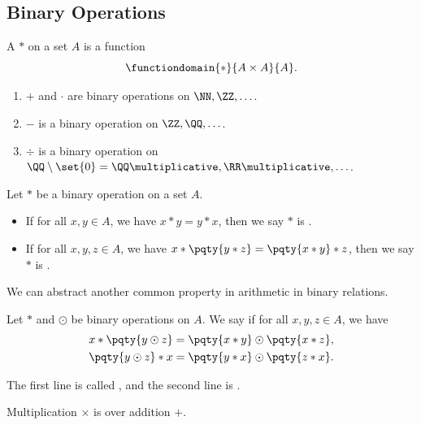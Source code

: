 \subsection{Binary Operations}
\label{sec:binary-operations}

\begin{definition}
    A  \(\ast\) on a set \(A\) is a function
    \[
        \functiondomain{\ast}{A \times A}{A}.
    \]
\end{definition}

\begin{examples}
    \begin{enumerate}
        \item \(+\) and \(\cdot\) are binary operations on \(\NN, \ZZ, \ldots\).
        \item \(-\) is a binary operation on \(\ZZ, \QQ, \ldots\).
        \item \(\div\) is a binary operation on \(\QQ \setminus \set{0} = \QQ\multiplicative, \RR\multiplicative, \ldots\).
    \end{enumerate}
\end{examples}

\begin{definition}
    Let \(\ast\) be a binary operation on a set \(A\).
    \begin{itemize}
        \item If for all \(x, y \in A\), we have \(x \ast y = y \ast x\), then we say \(\ast\) is .
        \item If for all \(x, y, z \in A\), we have \(x \ast \pqty{y \ast z} = \pqty{x \ast y} \ast z\), then we say \(\ast\) is .
    \end{itemize}
\end{definition}

We can abstract another common property in arithmetic in binary relations.

\begin{definition}[Distributive]
    Let \(\ast\) and \(\odot\) be binary operations on \(A\). We say  if for all \(x, y, z \in A\), we have
    \begin{align*}
        x \ast \pqty{y \odot z} &= \pqty{x \ast y} \odot \pqty{x \ast z}, \\
        \pqty{y \odot z} \ast x &= \pqty{y \ast x} \odot \pqty{z \ast x}.
    \end{align*}
\end{definition}

\begin{remark}
    The first line is called , and the second line is .
\end{remark}

\begin{example}[Distributivity]
    Multiplication \(\times\) is  over addition \(+\).
\end{example}